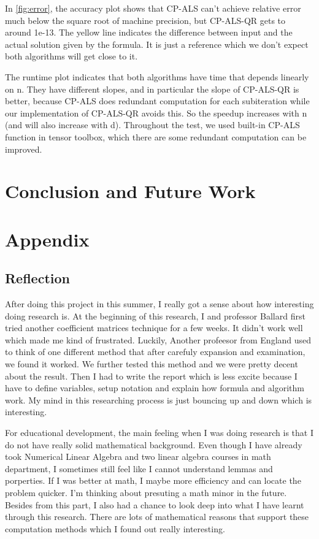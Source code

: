 \documentclass{article}
\begin{document}
In \cref*{fig:error},
the accuracy plot shows that CP-ALS can't achieve relative error much below the square root 
of machine precision, but CP-ALS-QR gets to around 1e-13. The yellow line indicates the difference
between input and the actual solution given by the formula. It is just a reference which we don't
expect both algorithms will get close to it.

The runtime plot indicates that both algorithms have time that depends linearly on n.  
They have different slopes, and in particular the slope of CP-ALS-QR is better, 
because CP-ALS does redundant computation for each subiteration while our implementation 
of CP-ALS-QR avoids this.  So the speedup increases with n (and will also increase with d).
Throughout the test, we used built-in CP-ALS function in tensor toolbox, which there are some redundant computation 
can be improved.




\section{Conclusion and Future Work}

\section{Appendix}
\subsection{Reflection}
After doing this project in this summer, I really got a sense about how interesting
doing research is. At the beginning of this research, I and professor Ballard
first tried another coefficient matrices technique for a few weeks. It didn't work
well which made me kind of frustrated. Luckily, Another profeesor from England 
used to think of one different method that after carefuly expansion and examination, we found 
it worked. We further tested this method and we were pretty decent about the result.
Then I had to write the report which is less excite because I have to define variables, setup notation
and explain how formula and algorithm work. My mind in this researching process is just bouncing up and down
which is interesting.

For educational development, the main feeling when I was doing research is that I do not have really solid mathematical
background. Even though I have already took Numerical Linear Algebra and two linear algebra courses in math department,
I sometimes still feel like I cannot understand lemmas and porperties. If I was better at 
math, I maybe more efficiency and can locate the problem quicker. I'm thinking about presuting a math minor in the 
future. Besides from this part, I also had a chance to look deep into what I have learnt through this research.
There are lots of mathematical reasons that support these computation methods which I found out really interesting.
\end{document}
